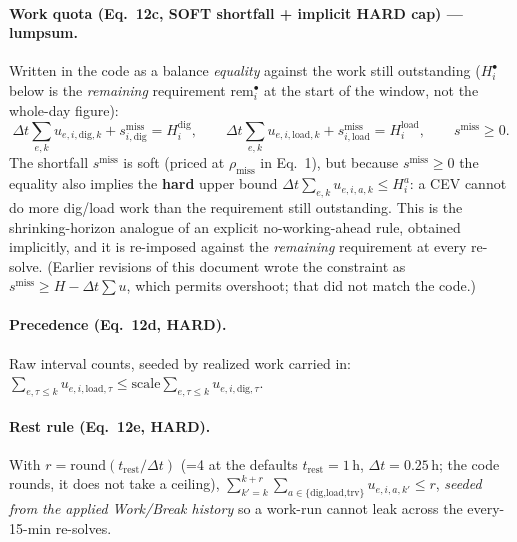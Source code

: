 \documentclass[11pt]{article}
\newcommand{\dt}{\Delta t}
\begin{document}
\paragraph{Work quota (Eq.\ 12c, SOFT shortfall + implicit HARD cap) --- lumpsum.}
Written in the code as a balance \emph{equality} against the work still outstanding
($H^{\bullet}_i$ below is the \emph{remaining} requirement $\text{rem}^{\bullet}_i$ at the
start of the window, not the whole-day figure):
\begin{equation}
\dt\!\!\sum_{e,k}\!u_{e,i,\text{dig},k}+s^{\text{miss}}_{i,\text{dig}}=H^{\text{dig}}_i,\qquad
\dt\!\!\sum_{e,k}\!u_{e,i,\text{load},k}+s^{\text{miss}}_{i,\text{load}}=H^{\text{load}}_i,\qquad
s^{\text{miss}}\ge0 .
\end{equation}
The shortfall $s^{\text{miss}}$ is soft (priced at $\rho_{\text{miss}}$ in Eq.~1), but because
$s^{\text{miss}}\ge0$ the equality also implies the \textbf{hard} upper bound
$\dt\sum_{e,k}u_{e,i,a,k}\le H^{a}_i$: a CEV cannot do more dig/load work than the requirement
still outstanding. This is the shrinking-horizon analogue of an explicit no-working-ahead rule,
obtained implicitly, and it is re-imposed against the \emph{remaining} requirement at every
re-solve. (Earlier revisions of this document wrote the constraint as
$s^{\text{miss}}\ge H-\dt\sum u$, which permits overshoot; that did not match the code.)

\paragraph{Precedence (Eq.\ 12d, HARD).}
Raw interval counts, seeded by realized work carried in:
$\sum_{e,\tau\le k}u_{e,i,\text{load},\tau}\le\text{scale}\sum_{e,\tau\le k}u_{e,i,\text{dig},\tau}$.

\paragraph{Rest rule (Eq.\ 12e, HARD).}
With $r=\mathrm{round}(t_{\text{rest}}/\dt)$ (=4 at the defaults $t_{\text{rest}}=1$\,h,
$\dt=0.25$\,h; the code rounds, it does not take a ceiling),
$\sum_{k'=k}^{k+r}\sum_{a\in\{\text{dig,load,trv}\}}u_{e,i,a,k'}\le r$, \emph{seeded from the
applied Work/Break history} so a work-run cannot leak across the every-15-min re-solves.
\end{document}
